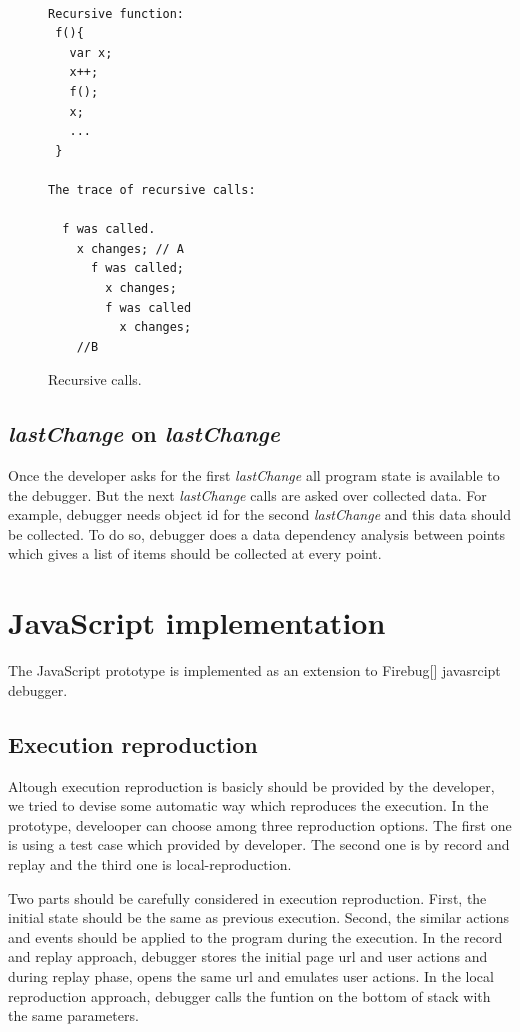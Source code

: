 \documentclass[preprint]{sigplanconf}
\begin{document}
\begin{figure}[htp]
\begin{verbatim}

Recursive function: 
 f(){
   var x;
   x++;
   f();
   x; 
   ...
 }

The trace of recursive calls:

  f was called.
    x changes; // A
      f was called;
        x changes;
        f was called
          x changes;
    //B 

\end{verbatim}
\caption{Recursive calls.}
\label{fig:recursive}
\end{figure}


\subsection{\textit{lastChange} on \textit{lastChange}}
Once the developer asks for the first \textit{lastChange} all program state is available to the debugger. But the next \textit{lastChange} calls are asked over collected data. For example, debugger needs object id for the second \textit{lastChange} and this data should be collected. To do so, debugger does a data dependency analysis between points which gives a list of items should be collected at every point.

\section{JavaScript implementation}
The JavaScript prototype is implemented as an extension to Firebug[] javasrcipt debugger. 

\subsection{Execution reproduction}
Altough execution reproduction is basicly should be provided by the developer, we tried to devise some automatic way which reproduces the execution. In the prototype, develooper can choose among three reproduction options. The first one is using a test case which provided by developer. The second one is by record and replay and the third one is local-reproduction.

Two parts should be carefully considered in execution reproduction. First, the initial state should be the same as previous execution. Second, the similar actions and events should be applied to the program during the execution. In the record and replay approach, debugger stores the initial page url and user actions and during replay phase, opens the same url and emulates user actions. 
In the local reproduction approach, debugger calls the funtion on the bottom of stack with the same parameters.
\end{document}
